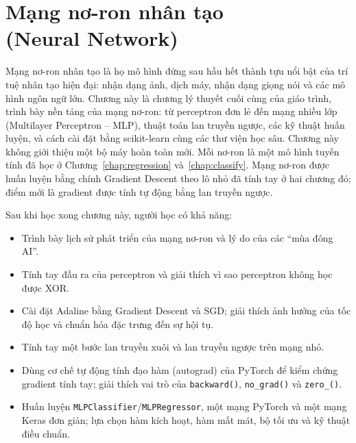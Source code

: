 
\chapter{Mạng nơ-ron nhân tạo \\ (Neural Network)}
\label{chap:neural-network}

Mạng nơ-ron nhân tạo là họ mô hình đứng sau hầu hết thành tựu nổi bật của trí tuệ nhân tạo hiện đại: nhận dạng ảnh, dịch máy, nhận dạng giọng nói và các mô hình ngôn ngữ lớn. Chương này là chương lý thuyết cuối cùng của giáo trình, trình bày nền tảng của mạng nơ-ron: từ perceptron đơn lẻ đến mạng nhiều lớp (Multilayer Perceptron -- MLP), thuật toán lan truyền ngược, các kỹ thuật huấn luyện, và cách cài đặt bằng scikit-learn cùng các thư viện học sâu. Chương này không giới thiệu một bộ máy hoàn toàn mới. Mỗi nơ-ron là một mô hình tuyến tính đã học ở Chương~\ref{chap:regression} và~\ref{chap:classify}. Mạng nơ-ron được huấn luyện bằng chính Gradient Descent theo lô nhỏ đã tính tay ở hai chương đó; điểm mới là gradient được tính tự động bằng lan truyền ngược.

\noindent Sau khi học xong chương này, người học có khả năng:
\begin{itemize}
    \item Trình bày lịch sử phát triển của mạng nơ-ron và lý do của các ``mùa đông AI''.
    \item Tính tay đầu ra của perceptron và giải thích vì sao perceptron không học được XOR.
    \item Cài đặt Adaline bằng Gradient Descent và SGD; giải thích ảnh hưởng của tốc độ học và chuẩn hóa đặc trưng đến sự hội tụ.
    \item Tính tay một bước lan truyền xuôi và lan truyền ngược trên mạng nhỏ.
    \item Dùng cơ chế tự động tính đạo hàm (autograd) của PyTorch để kiểm chứng gradient tính tay; giải thích vai trò của \texttt{backward()}, \texttt{no\_grad()} và \texttt{zero\_()}.
    \item Huấn luyện \texttt{MLPClassifier}/\texttt{MLPRegressor}, một mạng PyTorch và một mạng Keras đơn giản; lựa chọn hàm kích hoạt, hàm mất mát, bộ tối ưu và kỹ thuật điều chuẩn.
\end{itemize}

